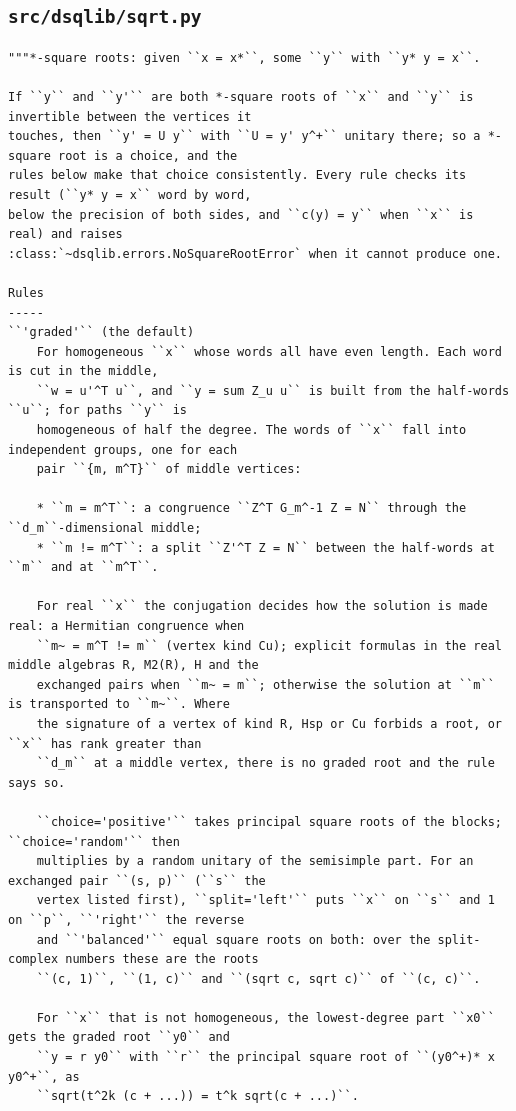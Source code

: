 \documentclass[12pt, a4paper]{report}
\theoremstyle{plain}
\theoremstyle{definition}
\theoremstyle{remark}
\theoremstyle{plain}
\begin{document}
\subsection{\texorpdfstring{\texttt{src/dsqlib/sqrt.py}}{src/dsqlib/sqrt.py}}
\begin{lstlisting}[style=dsqcode]
"""*-square roots: given ``x = x*``, some ``y`` with ``y* y = x``.

If ``y`` and ``y'`` are both *-square roots of ``x`` and ``y`` is invertible between the vertices it
touches, then ``y' = U y`` with ``U = y' y^+`` unitary there; so a *-square root is a choice, and the
rules below make that choice consistently. Every rule checks its result (``y* y = x`` word by word,
below the precision of both sides, and ``c(y) = y`` when ``x`` is real) and raises
:class:`~dsqlib.errors.NoSquareRootError` when it cannot produce one.

Rules
-----
``'graded'`` (the default)
    For homogeneous ``x`` whose words all have even length. Each word is cut in the middle,
    ``w = u'^T u``, and ``y = sum Z_u u`` is built from the half-words ``u``; for paths ``y`` is
    homogeneous of half the degree. The words of ``x`` fall into independent groups, one for each
    pair ``{m, m^T}`` of middle vertices:

    * ``m = m^T``: a congruence ``Z^T G_m^-1 Z = N`` through the ``d_m``-dimensional middle;
    * ``m != m^T``: a split ``Z'^T Z = N`` between the half-words at ``m`` and at ``m^T``.

    For real ``x`` the conjugation decides how the solution is made real: a Hermitian congruence when
    ``m~ = m^T != m`` (vertex kind Cu); explicit formulas in the real middle algebras R, M2(R), H and the
    exchanged pairs when ``m~ = m``; otherwise the solution at ``m`` is transported to ``m~``. Where
    the signature of a vertex of kind R, Hsp or Cu forbids a root, or ``x`` has rank greater than
    ``d_m`` at a middle vertex, there is no graded root and the rule says so.

    ``choice='positive'`` takes principal square roots of the blocks; ``choice='random'`` then
    multiplies by a random unitary of the semisimple part. For an exchanged pair ``(s, p)`` (``s`` the
    vertex listed first), ``split='left'`` puts ``x`` on ``s`` and 1 on ``p``, ``'right'`` the reverse
    and ``'balanced'`` equal square roots on both: over the split-complex numbers these are the roots
    ``(c, 1)``, ``(1, c)`` and ``(sqrt c, sqrt c)`` of ``(c, c)``.

    For ``x`` that is not homogeneous, the lowest-degree part ``x0`` gets the graded root ``y0`` and
    ``y = r y0`` with ``r`` the principal square root of ``(y0^+)* x y0^+``, as
    ``sqrt(t^2k (c + ...)) = t^k sqrt(c + ...)``.


\end{lstlisting}
\end{document}
